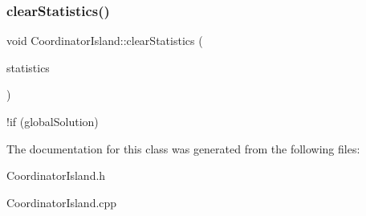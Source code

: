 \subsubsection{\texorpdfstring{clear\+Statistics()}{clearStatistics()}}
{\footnotesize\ttfamily void Coordinator\+Island\+::clear\+Statistics (\begin{DoxyParamCaption}\item[{vector$<$ vector$<$ \mbox{\hyperlink{structTStatistics}{T\+Statistics}} $>$ $>$ \&}]{statistics }\end{DoxyParamCaption})\hspace{0.3cm}{\ttfamily [private]}}

!if (global\+Solution) 

The documentation for this class was generated from the following files\+:\begin{DoxyCompactItemize}
\item 
Coordinator\+Island.\+h\item 
Coordinator\+Island.\+cpp\end{DoxyCompactItemize}
